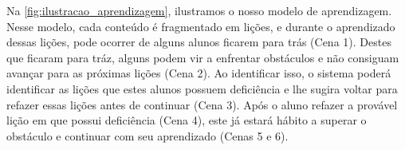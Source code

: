 \begin{figure}[H]
    \centering
\end{figure}

Na \autoref{fig:ilustracao_aprendizagem}, ilustramos o nosso modelo de aprendizagem. Nesse modelo, cada conteúdo é fragmentado em lições, e durante o aprendizado dessas lições, pode ocorrer de alguns alunos ficarem para trás (Cena 1). Destes que ficaram para tráz, alguns podem vir a enfrentar obstáculos e não consiguam avançar para as próximas lições (Cena 2). Ao identificar isso, o sistema poderá identificar as lições que estes alunos possuem deficiência e lhe sugira voltar para refazer essas lições antes de continuar (Cena 3). Após o aluno refazer a  provável lição em que possui deficiência (Cena 4), este já estará hábito a superar o obstáculo e continuar com seu aprendizado (Cenas 5 e 6).

\begin{figure}[H]
    \centering
\end{figure}